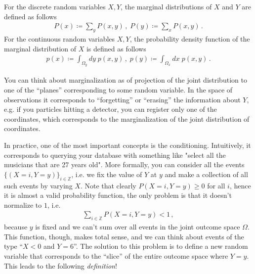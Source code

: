 \begin{mybox}
\begin{definition}\label{def:marg_dist}
    For the discrete random variables $X,Y$, the marginal distributions of $X$ and $Y$ are defined as follows
    \begin{align}
        P(x) \coloneqq \sum_y P(x,y)\,, \; P(y) \coloneqq \sum_x P(x,y)\,.
    \end{align}
    For the continuous random variables $X,Y$, the probability density function of the marginal distribution of $X$ is defined as follows
    \begin{align}
        p(x) \coloneqq \int_{\Omega_y} dy\; p(x,y)\,,\; p(y) \coloneqq \int_{\Omega_x} dx\; p(x,y)\,.
    \end{align}
\end{definition}
\end{mybox}

You can think about marginalization as of projection of the joint distribution to one of the ``planes'' corresponding to some random variable. 
In the space of observations it corresponds to ``forgetting'' or ``erasing'' the information about $Y$, e.g. if you particles hitting a detector, you can register only one of the coordinates, which corresponds to the marginalization of the joint distribution of coordinates.

In practice, one of the most important concepts is the conditioning.
Intuitively, it corresponds to querying your database with something like "select all the musicians that are 27 years old".
More formally, you can consider all the events $\{(X = i, Y=y)\}_{i \in \mathbb{Z}}$, i.e. we fix the value of $Y$ at $y$ and make a collection of all such events by varying $X$.
Note that clearly $P(X = i, Y = y) \geq 0$ for all $i$, hence it is almost a valid probability function, the only problem is that it doesn't normalize to $1$, i.e.
\begin{align}
    \sum_{i\in \mathbb{Z}} P(X = i, Y = y) < 1\,,
\end{align}
because $y$ is fixed and we can't sum over all events in the joint outcome space $\Omega$.
This function, though, makes total sense, and we can think about events of the type ``$X < 0$ and $Y = 6$''.
The solution to this problem is to define a new random variable that corresponds to the ``slice'' of the entire outcome space where $Y = y$.
This leads to the following \textit{definition}!

